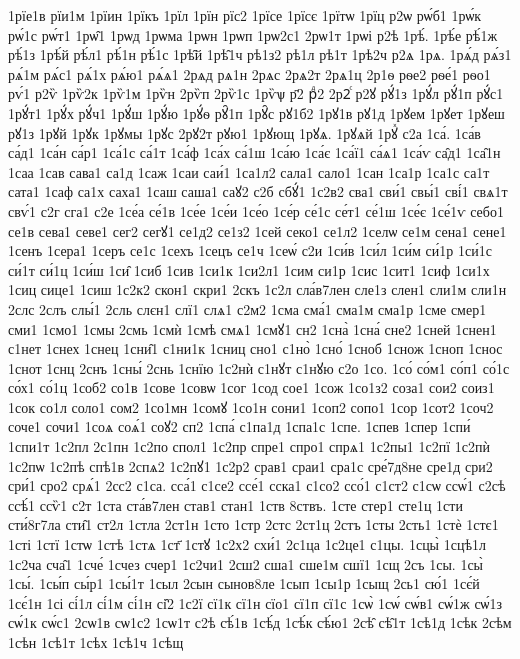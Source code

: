 {1рїе1в
рїи1м
1рїин
1рїкъ
1рїл
1рїн
рїс2
1рїсе
1рїсє
1рїтѡ
1рїц
р2ѡ
рѡ́б1
1рѡ́к
рѡ́1с
рѡ́т1
1рѡ̑1
1рѡд
1рѡма
1рѡн
1рѡп
1рѡ2с1
2рѡ1т
1рѡі
р2ѣ
1рѣ́.
1рѣ́е
рѣ́1ж
рѣ́1з
1рѣ́й
рѣ́л1
рѣ́1н
рѣ́1с
1рѣ̑й
1рѣ̑1ч
рѣ1з2
рѣ1л
рѣ1т
1рѣ2ч
р2ѧ
1рѧ.
1рѧ́д
рѧ́з1
рѧ́1м
рѧ́с1
рѧ́1х
рѧ́ю1
рѧ́ѧ1
2рѧд
рѧ1н
2рѧс
2рѧ2т
2рѧ1ц
2р1ѳ
рѳе2
рѳе́1
рѳо1
рѵ́1
р2ѷ
1рѷ2к
1рѷ1м
1рѷн
2рѷп
2рѷ1с
1рѷѱ
р҃2
рⷣ2
2р2ⷭ
р2ꙋ
рꙋ́1з
1рꙋ́л
рꙋ́1п
рꙋ́с1
1рꙋ́т1
1рꙋ́х
рꙋ́ч1
1рꙋ́ш
1рꙋ́ю
1рꙋ́ѳ
рꙋ̑1п
1рꙋ̑с
рꙋ1б2
1рꙋ1в
рꙋ1д
1рꙋем
1рꙋет
1рꙋеш
рꙋ1з
1рꙋй
1рꙋк
1рꙋмы
1рꙋс
2рꙋ2т
рꙋю1
1рꙋющ
1рꙋѧ.
1рꙋѧй
1рꙋⷯ
с2а
1са́.
1са́в
са́д1
1са́н
са́р1
1са́1с
са́1т
1са́ф
1са́х
са́1ш
1са́ю
1са́є
1са́ї1
са́ѧ1
1са́ѵ
са̑д1
1са̑1н
1саа
1сав
сава1
са1д
1саж
1саи
саи́1
1са1л2
сала1
сало1
1сан
1са1р
1са1с
са1т
сата1
1саф
са1х
саха1
1саш
саша1
саꙋ2
с2б
сбꙋ́1
1с2в2
сва1
сви́1
свы́1
сві́1
свѧ1т
свѵ́1
с2г
сга1
с2е
1се́а
се́1в
1се́е
1се́и
1се́о
1се́р
се́1с
се́т1
се́1ш
1се́є
1се́1ѵ
себо1
се1в
сева1
севе1
сег2
сегꙋ1
се1д2
се1з2
1сей
секо1
се1л2
1селѡ
се1м
сена1
сене1
1сенъ
1сера1
1серъ
се1с
1сехъ
1сецъ
се1ч
1сеѡ́
с2и
1си́в
1си́л
1си́м
си́1р
1си́1с
си́1т
си́1ц
1си́ш
1си̑
1сиб
1сив
1си1к
1си2л1
1сим
си1р
1сис
1сит1
1сиф
1си1х
1сиц
сице1
1сиш
1с2к2
скон1
скри1
2скъ
1с2л
сла́в7лен
сле1з
слен1
сли1м
сли1н
2слс
2слъ
слы́1
2сль
слєн1
слї1
слѧ1
с2м2
1сма
сма́1
сма1м
сма1р
1сме
смер1
сми1
1смо1
1смы
2смь
1смѝ
1смѣ
смѧ1
1смꙋ1
сн2
1сна̀
1сна́
сне2
1сней
1снен1
с1нет
1снех
1снец
1сни̑1
с1ни1к
1сниц
сно1
с1но̀
1сно́
1сноб
1снож
1сноп
1снос
1снот
1снц
2снъ
1сны́
2снь
1снїю
1с2нѝ
с1нꙋт
с1нꙋю
с2о
1со.
1со́
со́м1
со́п1
со́1с
со́х1
со́1ц
1соб2
со1в
1сове
1совѡ
1сог
1сод
сое1
1сож
1со1з2
соза1
сои2
соиз1
1сок
со1л
соло1
сом2
1со1мн
1сомꙋ
1со1н
сони1
1соп2
сопо1
1сор
1сот2
1соч2
соче1
сочи1
1соѧ
соѧ́1
соꙋ2
сп2
1спа́
с1па1д
1спа1с
1спе.
1спев
1спер
1спи́
1спи1т
1с2пл
2с1пн
1с2по
спол1
1с2пр
спре1
спро1
спрѧ1
1с2пы1
1с2пї
1с2пѝ
1с2пѡ
1с2пѣ
спѣ1в
2спѧ2
1с2пꙋ1
1с2р2
срав1
сраи1
сра1с
сре́7д8не
сре1д
сри2
сри́1
сро2
срѧ́1
2сс2
с1са.
сса́1
с1се2
ссе́1
сска1
с1со2
ссо́1
с1ст2
с1сѡ
ссѡ́1
с2сѣ
ссѣ́1
ссѷ1
с2т
1ста
ста́в7лен
став1
стан1
1ств
8ствъ.
1сте
стер1
сте1ц
1сти
сти́8г7ла
сти̑1
ст2л
1стла
2ст1н
1сто
1стр
2стс
2ст1ц
2стъ
1сты
2сть1
1стѐ
1стє1
1сті
1стї
1стѡ
1стѣ
1стѧ
1ст҃
1стꙋ
1с2х2
схи́1
2с1ца
1с2це1
с1цы.
1сцы̀
1сцѣ1л
1с2ча
сча̑1
1сче́
1счез
счер1
1с2чи1
2сш2
сша1
сше1м
сшї1
1сщ
2съ
1сы.
1сы̀
1сы́.
1сы́п
сы́р1
1сы́1т
1сыл
2сын
сынов8ле
1сып
1сы1р
1сыщ
2сь1
сю́1
1сє́й
1сє́1н
1сі
сі́1л
сі́1м
сі́1н
сі̑2
1с2ї
сї1к
сї1н
сїо1
сї1п
сї1с
1сѡ̀
1сѡ́
сѡ́в1
сѡ́1ж
сѡ́1з
сѡ́1к
сѡ́с1
2сѡ1в
сѡ1с2
1сѡ1т
с2ѣ
сѣ́1в
1сѣ́д
1сѣ́к
сѣ́ю1
2сѣ̑
сѣ̑1т
1сѣ1д
1сѣк
2сѣм
1сѣн
1сѣ1т
1сѣх
1сѣ1ч
1сѣщ
}
